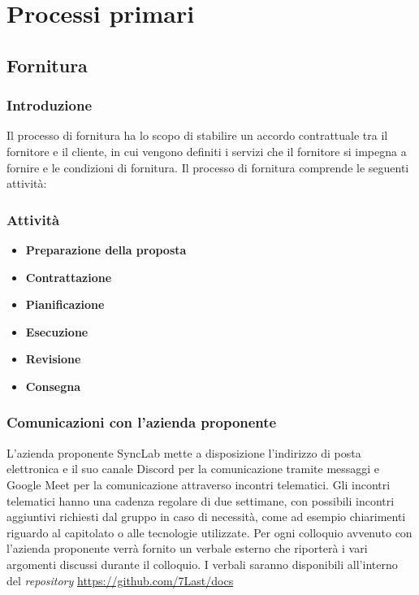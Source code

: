 \section{Processi primari}
\subsection{Fornitura}
\subsubsection{Introduzione}
Il processo di fornitura ha lo scopo di stabilire un accordo contrattuale tra il fornitore e il cliente, in cui vengono definiti i servizi che il fornitore si impegna a fornire e le condizioni di fornitura.
Il processo di fornitura comprende le seguenti attività:
\subsubsection{Attività}
\begin{itemize}
	\item \textbf{Preparazione della proposta}
	\item \textbf{Contrattazione}
	\item \textbf{Pianificazione}
	\item \textbf{Esecuzione}
	\item \textbf{Revisione}
	\item \textbf{Consegna}
\end{itemize}

\subsubsection{Comunicazioni con l'azienda proponente}
L'azienda proponente SyncLab mette a disposizione l'indirizzo di posta elettronica e il suo canale Discord per la comunicazione tramite messaggi e Google Meet per la comunicazione attraverso incontri telematici.
Gli incontri telematici hanno una cadenza regolare di due settimane, con possibili incontri aggiuntivi richiesti dal gruppo in caso di necessità, come ad esempio chiarimenti riguardo al capitolato o alle tecnologie utilizzate.
Per ogni colloquio avvenuto con l'azienda proponente verrà fornito un verbale esterno che riporterà i vari argomenti discussi durante il colloquio.
I verbali saranno disponibili all'interno del \textit{repository} \url{https://github.com/7Last/docs}
